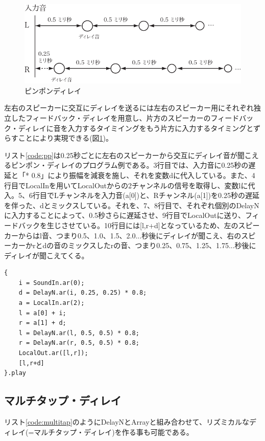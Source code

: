 \documentclass{jsarticle}
\begin{document}
\begin{figure}[htbp]
	\begin{center}
		\includegraphics[scale=0.65]{pingpong.pdf}
	\end{center}
	\caption{ピンポンディレイ}
	\label{fig:pingpong}
\end{figure}

左右のスピーカーに交互にディレイを送るには左右のスピーカー用にそれぞれ独立したフィードバック・ディレイを用意し、片方のスピーカーのフィードバック・ディレイに音を入力するタイミイングをもう片方に入力するタイミングとずらすことにより実現できる(図\ref{fig:pingpong})。

リスト\ref{code:pp}は0.25秒ごとに左右のスピーカーから交互にディレイ音が聞こえるピンポン・ディレイのプログラム例である。3行目では、入力音に0.25秒の遅延と「* 0.8」により振幅を減衰を施し、それを変数dに代入している。また、4行目でLocalInを用いてLocalOutからの2チャンネルの信号を取得し、変数lに代入。5、6行目でLチャンネルを入力音(a[0])と、Rチャンネル(a[1])を0.25秒の遅延を伴った、dとミックスしている。それを、7、8行目で、それぞれ個別のDelayNに入力することによって、0.5秒さらに遅延させ、9行目でLocalOutに送り、フィードバックを生じさせている。10行目には[l,r+d]となっているため、左のスピーカーからはl音、つまり0.5、1.0、1.5、2.0...秒後にディレイが聞こえ、右のスピーカーかrとdの音のミックスしたrの音、つまり0.25、0.75、1.25、1.75...秒後にディレイが聞こえてくる。

\begin{lstlisting}[caption=ピンポン・ディレイ, label=code:pp]
{
	i = SoundIn.ar(0);
	d = DelayN.ar(i, 0.25, 0.25) * 0.8;
	a = LocalIn.ar(2);
	l = a[0] + i;
	r = a[1] + d;
	l = DelayN.ar(l, 0.5, 0.5) * 0.8; 
	r = DelayN.ar(r, 0.5, 0.5) * 0.8;
	LocalOut.ar([l,r]);
	[l,r+d]
}.play
\end{lstlisting}

\subsection{マルチタップ・ディレイ}
リスト\ref{code:multitap}のようにDelayNとArrayと組み合わせて、リズミカルなディレイ(=マルチタップ・ディレイ)を作る事も可能である。
\end{document}
